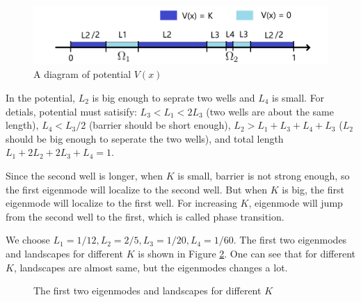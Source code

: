 \documentclass[12pt,a4paper]{article}
\begin{document}
\begin{figure}[h]
\centering
\includegraphics[width=0.7\linewidth]{PV}
\caption{A diagram of potential $V(x)$}
\label{fig:11p}
\end{figure}

In the potential, $L_2$ is big enough to seprate two wells and $L_4$ is small. For detials, potential must satisify: $L_3 < L_1 < 2 L_3$ (two wells are about the same length), $L_4 < L_3 / 2$ (barrier should be short enough), $L_2 > L_1+ L_3 + L_4 + L_3$ ($L_2$ should be big enough to seperate the two wells), and total length $L_1 + 2 L_2 + 2L_3 + L_4 = 1$.

Since the second well is longer, when $K$ is small, barrier is not strong enough, so the first eigenmode will localize to the second well. But when $K$ is big, the first eigenmode will localize to the first well. For increasing $K$, eigenmode will jump from the second well to the first, which is called phase transition.

We choose $L_1 = 1/12, L_2 = 2/5, L_3= 1/20, L_4 = 1/60$. The first two eigenmodes and landscapes for different $K$ is shown in Figure \ref{fig:12}. One can see that for different $K$, landscapes are almost same, but the eigenmodes changes a lot.
\begin{figure}[h]
\centering
{}
\caption{The first two eigenmodes and landscapes for different $K$}
\label{fig:12}
\end{figure}
\end{document}
